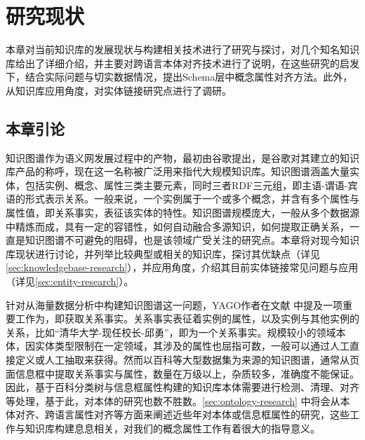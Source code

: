 \chapter{研究现状}
\label{cha:research}
本章对当前知识库的发展现状与构建相关技术进行了研究与探讨，对几个知名知识库给出了详细介绍，并主要对跨语言本体对齐技术进行了说明，在这些研究的启发下，结合实际问题与切实数据情况，提出Schema层中概念属性对齐方法。此外，从知识库应用角度，对实体链接研究点进行了调研。

\section{本章引论}

知识图谱作为语义网发展过程中的产物，最初由谷歌提出，是谷歌对其建立的知识库产品的称呼，现在这一名称被广泛用来指代大规模知识库。知识图谱涵盖大量实体，包括实例、概念、属性三类主要元素，同时三者RDF三元组，即主语-谓语-宾语的形式表示关系。一般来说，一个实例属于一个或多个概念，并含有多个属性与属性值，即关系事实，表征该实体的特性。知识图谱规模庞大，一般从多个数据源中精炼而成，具有一定的容错性，如何自动融合多源知识，如何提取正确关系，一直是知识图谱不可避免的阻碍，也是该领域广受关注的研究点。本章将对现今知识库现状进行讨论，并列举比较典型或相关的知识库，探讨其优缺点（详见\ref{sec:knowledgebase-research}），并应用角度，介绍其目前实体链接常见问题与应用（详见\ref{sec:entity-research}）。

针对从海量数据分析中构建知识图谱这一问题，YAGO作者在文献\cite{suchanek2014knowledge} 中提及一项重要工作为，即获取关系事实。关系事实表征着实例的属性，以及实例与其他实例的关系，比如“清华大学-现任校长-邱勇”，即为一个关系事实。规模较小的领域本体，因实体类型限制在一定领域，其涉及的属性也屈指可数，一般可以通过人工直接定义\cite{boyce2007developing}或人工抽取\cite{wang:movie}来获得。然而以百科等大型数据集为来源的知识图谱，通常从页面信息框中提取关系事实与属性，数量在万级以上，杂质较多，准确度不能保证。因此，基于百科分类树与信息框属性构建的知识库本体需要进行检测、清理、对齐等处理，基于此，对本体的研究也数不胜数。\ref{sec:ontology-research} 中将会从本体对齐、跨语言属性对齐等方面来阐述近些年对本体或信息框属性的研究，这些工作与知识库构建息息相关，对我们的概念属性工作有着很大的指导意义。

